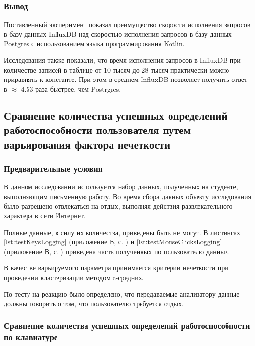 \subsubsection*{Вывод}

Поставленный эксперимент показал преимущество скорости исполнения запросов в базу данных InfluxDB над скоростью исполнения запросов в базу данных Postgres с использованием языка программирования Kotlin.

Исследования также показали, что время исполнения запросов в InfluxDB при количестве записей в таблице от 10 тысяч до 28 тысяч практически можно приравнять к константе. При этом в среднем InfluxDB позволяет получить ответ в $\approx$ 4.53 раза быстрее, чем Postrgres.

\subsection{Сравнение количества успешных определений работоспособности пользователя путем варьирования фактора нечеткости}

\subsubsection{Предварительные условия}

В данном исследовании используется набор данных, полученных на студенте, выполняющим письменную работу. Во время сбора данных объекту исследования было разрешено отвлекаться на отдых, выполняя действия развлекательного характера в сети Интернет.

Полные данные, в силу их количества, приведены быть не могут. В листингах \ref{lst:testKeysLogging} (приложение В, с. \pageref{chp:application-c}) и \ref{lst:testMouseClicksLogging} (приложение В, с. \pageref{chp:application-c}) приведена часть полученных по пользователю данных.

В качестве варьируемого параметра принимается критерий нечеткости при проведении кластеризации методом c-средних.

По тесту на реакцию было определено, что передаваемые анализатору данные должны говорить о том, что пользователю требуется отдых.

\subsubsection[Сравнение количества успешных определений работоспособности по \newline клавиатуре]{Сравнение количества успешных определений работоспособности по клавиатуре}

